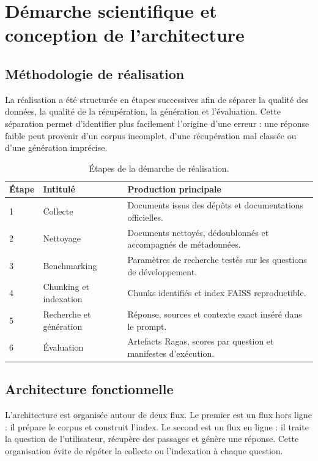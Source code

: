 \documentclass[12pt,a4paper,oneside]{report}
\begin{document}
\chapter{Démarche scientifique et conception de l'architecture}
\label{chap:conception}

\section{Méthodologie de réalisation}

La réalisation a été structurée en étapes successives afin de séparer la qualité
des données, la qualité de la récupération, la génération et l'évaluation. Cette
séparation permet d'identifier plus facilement l'origine d'une erreur : une
réponse faible peut provenir d'un corpus incomplet, d'une récupération mal
classée ou d'une génération imprécise.

\begin{table}[H]
\centering
\caption{Étapes de la démarche de réalisation.}
\label{tab:demarche}
\begin{tabularx}{\textwidth}{p{1.2cm}p{3.2cm}Y}
\toprule
\textbf{Étape} & \textbf{Intitulé} & \textbf{Production principale}\\
 & Collecte & Documents issus des dépôts et documentations officielles.\\
2 & Nettoyage & Documents nettoyés, dédoublonnés et accompagnés de métadonnées.\\
3 & Benchmarking & Paramètres de recherche testés sur les questions de développement.\\
4 & Chunking et indexation & Chunks identifiés et index FAISS reproductible.\\
5 & Recherche et génération & Réponse, sources et contexte exact inséré dans le prompt.\\
6 & Évaluation & Artefacts Ragas, scores par question et manifestes d'exécution.\\
\bottomrule
\end{tabularx}
\end{table}

\section{Architecture fonctionnelle}

L'architecture est organisée autour de deux flux. Le premier est un flux hors
ligne : il prépare le corpus et construit l'index. Le second est un flux en
ligne : il traite la question de l'utilisateur, récupère des passages et génère
une réponse. Cette organisation évite de répéter la collecte ou l'indexation à
chaque question.
\end{document}
